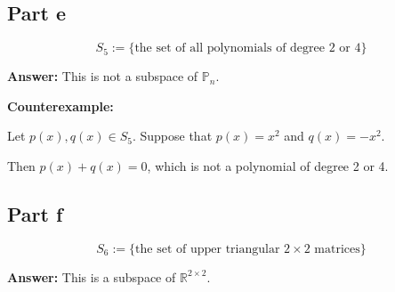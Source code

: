 \documentclass{article}
\begin{document}
\subsection*{Part e}
\[ S_{5} := \{\text{the set of all polynomials of degree 2 or 4}\} \]

\textbf{Answer:} This is not a subspace of $\mathbb{P}_{n}$. %

\textbf{Counterexample:}


Let $p(x), q(x) \in S_{5}$.
Suppose that $p(x) = x^2$ and $q(x) = -x^2$.


Then $p(x) + q(x) = 0$, which is not a polynomial of degree 2 or 4.

\subsection*{Part f}
\[ S_{6} := \{\text{the set of upper triangular } 2 \times 2 \text{ matrices}\} \]

\textbf{Answer:} This is a subspace of $\mathbb{R}^{2 \times 2}$.
\end{document}

